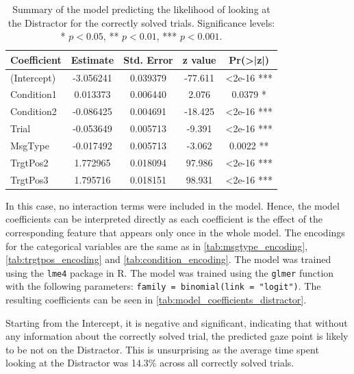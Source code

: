\begin{table}[h!]
\centering
\begin{tabular}{|l|c|c|c|c|}
\hline
\textbf{Coefficient} & \textbf{Estimate} & \textbf{Std. Error} & \textbf{z value} & \textbf{Pr(>|z|)} \\ \hline
(Intercept)          & -3.056241         & 0.039379            & -77.611          & <2e-16 ***        \\ \hline
Condition1           & 0.013373          & 0.006440            & 2.076            & 0.0379 *          \\ \hline
Condition2           & -0.086425         & 0.004691            & -18.425          & <2e-16 ***        \\ \hline
Trial                & -0.053649         & 0.005713            & -9.391           & <2e-16 ***        \\ \hline
MsgType             & -0.017492         & 0.005713            & -3.062           & 0.0022 **         \\ \hline
TrgtPos2             & 1.772965          & 0.018094            & 97.986           & <2e-16 ***        \\ \hline
TrgtPos3             & 1.795716          & 0.018151            & 98.931           & <2e-16 ***        \\ \hline
\end{tabular}
\caption{Summary of the model predicting the likelihood of looking at the Distractor for the correctly solved trials. Significance levels: * $p < 0.05$, ** $p < 0.01$, *** $p < 0.001$.}
\label{tab:model_coefficients_distractor}
\end{table}

In this case, no interaction terms were included in the model. Hence, the model coefficients can be interpreted directly as each coefficient is the effect of the corresponding feature that appears only once in the whole model. The encodings for the categorical variables are the same as in \autoref{tab:msgtype_encoding}, \autoref{tab:trgtpos_encoding} and \autoref{tab:condition_encoding}. The model was trained using the \texttt{lme4} package in R. The model was trained using the \texttt{glmer} function with the following parameters: \texttt{family = binomial(link = "logit")}. The resulting coefficients can be seen in \autoref{tab:model_coefficients_distractor}.

Starting from the Intercept, it is negative and significant, indicating that without any information about the correctly solved trial, the predicted gaze point is likely to be not on the Distractor. This is unsurprising as the average time spent looking at the Distractor was 14.3\% across all correctly solved trials. 


